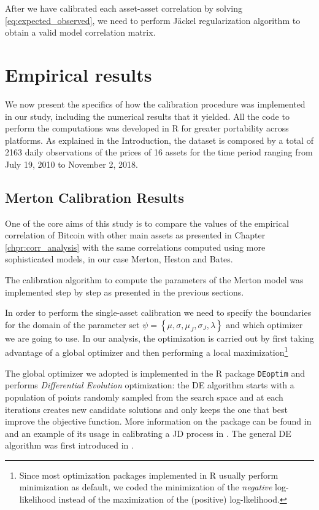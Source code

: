 After we have calibrated each asset-asset correlation by solving \eqref{eq:expected_observed}, we need to perform J\"ackel regularization algorithm to obtain a valid model correlation matrix.

\bigskip
\section{Empirical results}
\label{sec:results_cal}
We now present the specifics of how the calibration procedure was implemented in our study, including the numerical results that it yielded.
All the code to perform the computations was developed in R for greater portability across platforms. 	
As explained in the Introduction, the dataset is composed by a total of 2163 daily observations of the prices of 16 assets for the time period ranging from July 19, 2010 to November 2, 2018.

\subsection{Merton Calibration Results}
One of the core aims of this study is to compare the values of the empirical correlation of Bitcoin with other main assets as presented in Chapter \ref{chpr:corr_analysis} with the same correlations computed using more sophisticated models, in our case Merton, Heston and Bates.

The calibration algorithm to compute the parameters of the Merton model was implemented step by step as presented in the previous sections.

In order to perform the single-asset calibration we need to specify the boundaries for the domain of the parameter set $\psi =  \left\{ \mu, \sigma, \mu_J, \sigma_J, \lambda \right\}$ and which optimizer we are going to use.
In our analysis, the optimization is carried out by first taking advantage of a global optimizer and then performing a local maximization\footnote{Since most optimization packages implemented in R usually perform minimization as default, we coded the minimization of the \textit{negative} log-likelihood instead of the maximization of the (positive) log-lkelihood.}

The global optimizer we adopted is implemented in the R package \texttt{DEoptim} and performs \textit{Differential Evolution} optimization: the DE algorithm starts with a population of points randomly sampled from the search space and at each iterations creates new candidate solutions and only keeps the one that best improve the objective function. More information on the package can be found in \citep{DEoptim_manual} and an example of its usage in calibrating a JD process in \citep{DEoptim_jumpdiffusion}. The general DE algorithm was first introduced in \citep{DEoptim_book}.

